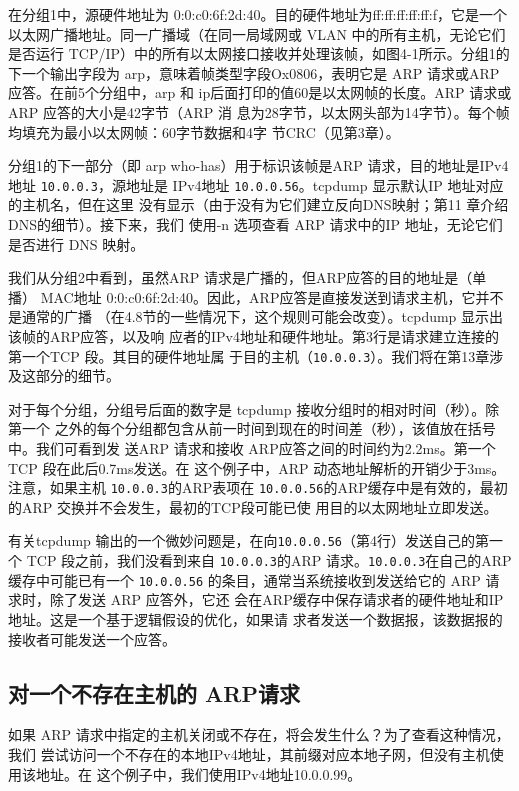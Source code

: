 在分组1中，源硬件地址为 0:0:c0:6f:2d:40。目的硬件地址为ff:ff:ff:ff:ff:f，它是一个
以太网广播地址。同一广播域（在同一局域网或 VLAN 中的所有主机，无论它们是否运行
TCP/IP）中的所有以太网接口接收并处理该帧，如图4-1所示。分组1的下一个输出字段为
arp，意味着帧类型字段Ox0806，表明它是 ARP 请求或ARP应答。在前5个分组中，arp
和 ip后面打印的值60是以太网帧的长度。ARP 请求或ARP 应答的大小是42字节（ARP 消
息为28字节，以太网头部为14字节）。每个帧均填充为最小以太网帧：60字节数据和4字
节CRC（见第3章）。

分组1的下一部分（即 arp who-has）用于标识该帧是ARP 请求，目的地址是IPv4地址
\verb|10.0.0.3|，源地址是 IPv4地址 \verb|10.0.0.56|。tcpdump 显示默认IP 地址对应的主机名，但在这里
没有显示（由于没有为它们建立反向DNS映射；第11 章介绍 DNS的细节）。接下来，我们
使用-n 选项查看 ARP 请求中的IP 地址，无论它们是否进行 DNS 映射。

我们从分组2中看到，虽然ARP 请求是广播的，但ARP应答的目的地址是（单播）
MAC地址 0:0:c0:6f:2d:40。因此，ARP应答是直接发送到请求主机，它并不是通常的广播
（在4.8节的一些情况下，这个规则可能会改变）。tcpdump 显示出该帧的ARP应答，以及响
应者的IPv4地址和硬件地址。第3行是请求建立连接的第一个TCP 段。其目的硬件地址属
于目的主机（\verb|10.0.0.3|）。我们将在第13章涉及这部分的细节。

对于每个分组，分组号后面的数字是 tcpdump 接收分组时的相对时间（秒）。除第一个
之外的每个分组都包含从前一时间到现在的时间差（秒），该值放在括号中。我们可看到发
送ARP 请求和接收 ARP应答之间的时间约为2.2ms。第一个TCP 段在此后0.7ms发送。在
这个例子中，ARP 动态地址解析的开销少于3ms。注意，如果主机 \verb|10.0.0.3|的ARP表项在
\verb|10.0.0.56|的ARP缓存中是有效的，最初的ARP 交换并不会发生，最初的TCP段可能已使
用目的以太网地址立即发送。

有关tcpdump 输出的一个微妙问题是，在向\verb|10.0.0.56|（第4行）发送自己的第一个 TCP
段之前，我们没看到来自 \verb|10.0.0.3|的ARP 请求。\verb|10.0.0.3|在自己的ARP缓存中可能已有一个
\verb|10.0.0.56| 的条目，通常当系统接收到发送给它的 ARP 请求时，除了发送 ARP 应答外，它还
会在ARP缓存中保存请求者的硬件地址和IP 地址。这是一个基于逻辑假设的优化，如果请
求者发送一个数据报，该数据报的接收者可能发送一个应答。

\subsection{对一个不存在主机的 ARP请求}

如果 ARP 请求中指定的主机关闭或不存在，将会发生什么？为了查看这种情况，我们
尝试访问一个不存在的本地IPv4地址，其前缀对应本地子网，但没有主机使用该地址。在
这个例子中，我们使用IPv4地址10.0.0.99。

